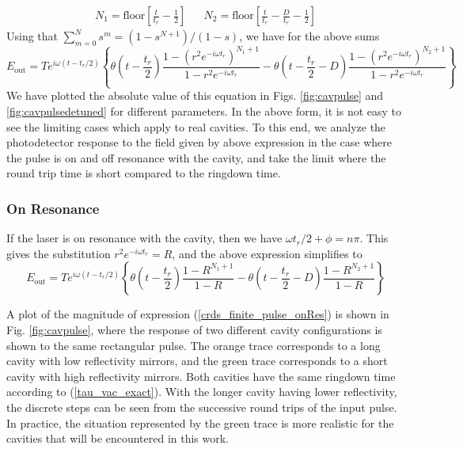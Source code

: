 \begin{align}
	N_1 = \mathrm{floor}\left[ \frac{t}{t_r} - \frac{1}{2} \right] && N_2 = \mathrm{floor}\left[ \frac{t}{t_r} - \frac{D}{t_r} - \frac{1}{2} \right]
\end{align}
Using that $\sum_{m=0}^{N} s^m = (1-s^{N+1})/(1-s)$, we have for the above sums
\begin{equation} \label{crds_finite_pulse_general}
	E_\mathrm{out} = T e^{i\omega \left(t - t_r/2\right)}\left\{
	\theta\left(t-\frac{t_r}{2}\right)
	\frac{1 - \left(r^2 e^{-i \omega t_r}\right)^{N_1+1}}{1-r^2 e^{-i\omega t_r}} -
	\theta\left(t-\frac{t_r}{2} - D\right)
	\frac{1 - \left(r^2 e^{-i \omega t_r}\right)^{N_2+1}}{1-r^2 e^{-i\omega t_r}}
	\right\}
\end{equation}
We have plotted the absolute value of this equation in Figs. \ref{fig:cavpulse} and \ref{fig:cavpulsedetuned} for different parameters. In the above form, it is not easy to see the limiting cases which apply to real cavities. To this end, we analyze the photodetector response to the field given by above expression in the case where the pulse is on and off resonance with the cavity, and take the limit where the round trip time is short compared to the ringdown time.
\subsubsection{On Resonance}
If the laser is on resonance with the cavity, then we have $\omega t_r/2 + \phi = n\pi$. This gives the substitution $r^2 e^{-i\omega t_r} = R$, and the above expression simplifies to
\begin{equation} \label{crds_finite_pulse_onRes}
	E_\mathrm{out} = T e^{i\omega \left(t - t_r/2\right)}\left\{
	\theta\left(t-\frac{t_r}{2}\right)
	\frac{1 - R^{N_1+1}}{1-R} -
	\theta\left(t-\frac{t_r}{2} - D\right)
	\frac{1 - R^{N_2+1}}{1-R}
	\right\}
\end{equation}

A plot of the magnitude of expression (\ref{crds_finite_pulse_onRes}) is shown in Fig. \ref{fig:cavpulse}, where the response of two different cavity configurations is shown to the same rectangular pulse. The orange trace corresponds to a long cavity with low reflectivity mirrors, and the green trace corresponds to a short cavity with high reflectivity mirrors. Both cavities have the same ringdown time according to (\ref{tau_vac_exact}). With the longer cavity having lower reflectivity, the discrete steps can be seen from the successive round trips of the input pulse. In practice, the situation represented by the green trace is more realistic for the cavities that will be encountered in this work.


